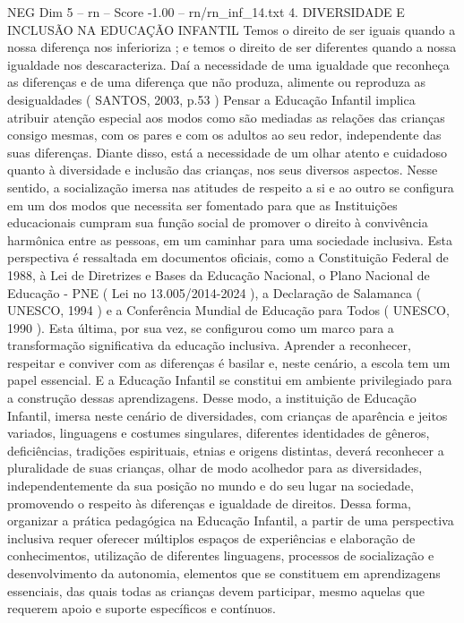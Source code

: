 \begin{textsample}{NEG Dim 5 – rn – Score -1.00 – rn/rn\_inf\_14.txt}  \label{ex:f5_neg_143}
4.
DIVERSIDADE E INCLUSÃO NA EDUCAÇÃO INFANTIL Temos o direito de ser iguais quando a nossa diferença nos inferioriza ; e temos o direito de ser diferentes quando a nossa igualdade nos descaracteriza.
Daí a necessidade de uma igualdade que reconheça as diferenças e de uma diferença que não produza, alimente ou reproduza as desigualdades ( SANTOS, 2003, p.53 ) Pensar a Educação Infantil implica atribuir atenção especial aos modos como são mediadas as relações das crianças consigo mesmas, com os pares e com os adultos ao seu redor, independente das suas diferenças.
Diante disso, está a necessidade de um olhar atento e cuidadoso quanto à diversidade e inclusão das crianças, nos seus diversos aspectos.
Nesse sentido, a socialização imersa nas atitudes de respeito a si e ao outro se configura em um dos modos que necessita ser fomentado para que as Instituições educacionais cumpram sua função social de promover o direito à convivência harmônica entre as pessoas, em um caminhar para uma sociedade inclusiva.
Esta perspectiva é ressaltada em documentos oficiais, como a Constituição Federal de 1988, à Lei de Diretrizes e Bases da Educação Nacional, o Plano Nacional de Educação - PNE ( Lei no 13.005/2014-2024 ), a Declaração de Salamanca ( UNESCO, 1994 ) e a Conferência Mundial de Educação para Todos ( UNESCO, 1990 ).
Esta última, por sua vez, se configurou como um marco para a transformação significativa da educação inclusiva.
Aprender a reconhecer, respeitar e conviver com as diferenças é basilar e, neste cenário, a escola tem um papel essencial.
E a Educação Infantil se constitui em ambiente privilegiado para a construção dessas aprendizagens.
Desse modo, a instituição de Educação Infantil, imersa neste cenário de diversidades, com crianças de aparência e jeitos variados, linguagens e costumes singulares, diferentes identidades de gêneros, deficiências, tradições espirituais, etnias e origens distintas, deverá reconhecer a pluralidade de suas crianças, olhar de modo acolhedor para as diversidades, independentemente da sua posição no mundo e do seu lugar na sociedade, promovendo o respeito às diferenças e igualdade de direitos.
Dessa forma, organizar a prática pedagógica na Educação Infantil, a partir de uma perspectiva inclusiva requer oferecer múltiplos espaços de experiências e elaboração de conhecimentos, utilização de diferentes linguagens, processos de socialização e desenvolvimento da autonomia, elementos que se constituem em aprendizagens essenciais, das quais todas as crianças devem participar, mesmo aquelas que requerem apoio e suporte específicos e contínuos.

\end{textsample}

